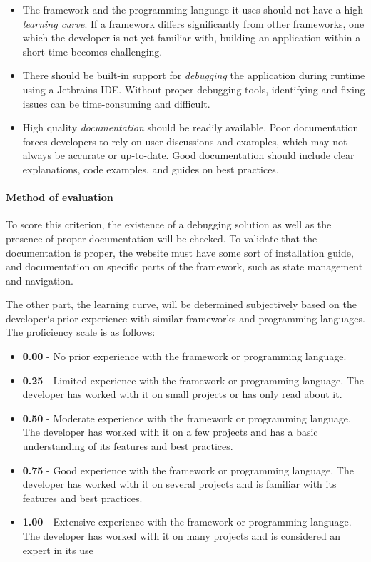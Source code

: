 \begin{itemize}
	\item The framework and the programming language it uses should not have a high \emph{learning curve}.
	      If a framework differs significantly from other frameworks, one which the developer is not yet familiar with, building an application within a short time becomes challenging.
	\item There should be built-in support for \emph{debugging} the application during runtime using a Jetbrains IDE.
	      Without proper debugging tools, identifying and fixing issues can be time-consuming and difficult.
	\item High quality \emph{documentation} should be readily available.
	      Poor documentation forces developers to rely on user discussions and examples, which may not always be accurate or up-to-date.
	      Good documentation should include clear explanations, code examples, and guides on best practices.
\end{itemize}

\paragraph{Method of evaluation}
To score this criterion, the existence of a debugging solution as well as the presence of proper documentation will be checked.
To validate that the documentation is proper, the website must have some sort of installation guide, and documentation on specific parts of the framework, such as state management and navigation.

The other part, the learning curve, will be determined subjectively based on the developer`s prior experience with similar frameworks and programming languages.
The proficiency scale is as follows:

\begin{itemize}
	\item \textbf{0.00} - No prior experience with the framework or programming language.
	\item \textbf{0.25} - Limited experience with the framework or programming language.
	      The developer has worked with it on small projects or has only read about it.
	\item \textbf{0.50} - Moderate experience with the framework or programming language.
	      The developer has worked with it on a few projects and has a basic understanding of its features and best practices.
	\item \textbf{0.75} - Good experience with the framework or programming language.
	      The developer has worked with it on several projects and is familiar with its features and best practices.
	\item \textbf{1.00} - Extensive experience with the framework or programming language.
	      The developer has worked with it on many projects and is considered an expert in its use
\end{itemize}

